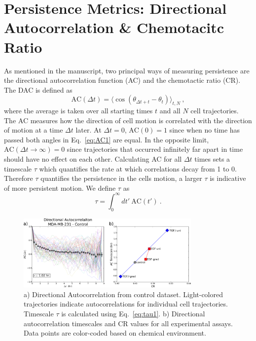 

\section{Persistence Metrics: Directional Autocorrelation \& Chemotacitc Ratio}

As mentioned in the manuscript, two principal ways of measuring persistence are the directional autocorrelation function (AC) and the chemotactic ratio (CR). The DAC is defined as
\begin{equation} \label{eq:AC1}
    \text{AC}(\Delta t) = \langle \cos(\theta_{\Delta t + t}-\theta_{t}) \rangle_{t,N} \ ,
\end{equation}
where the average is taken over all starting times $t$ and all $N$ cell trajectories. The AC measures how the direction of cell motion is correlated with the direction of motion at a time $\Delta t$ later.
At $\Delta t = 0$, $\text{AC}(0) = 1$ since when no time has passed both angles in Eq.\ \ref{eq:AC1} are equal. In the opposite limit,
$\text{AC}(\Delta t \to \infty) = 0$ since trajectories that occurred infinitely far apart in time should have no effect on each other. Calculating AC for all $\Delta t$ times sets a timescale $\tau$ which quantifies the rate at which correlations decay from 1 to 0. Therefore $\tau$ quantifies the persistence in the cells motion, a larger $\tau$ is indicative of more persistent motion. We define $\tau$ as
\begin{equation} \label{eq:tau1}
    \tau = \int_0^\infty dt' \ \text{AC}(t') \ .
\end{equation}

\begin{figure}[ht]
    \centering
    \includegraphics[width=0.80\textwidth]{../fig/ch2_fig5.png}
    \caption{a) Directional Autocorrelation from control dataset. Light-colored trajectories indicate autocorrelations for individual cell trajectories. Timescale $\tau$ is calculated using Eq.\ \ref{eq:tau1}. b) Directional autocorrelation timescales and CR values for all experimental assays. Data points are color-coded based on chemical environment.} \label{fig:ch2_5}
\end{figure}

